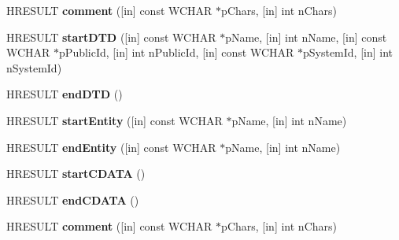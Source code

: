 \begin{DoxyCompactItemize}
H\+R\+E\+S\+U\+LT {\bfseries comment} (\mbox{[}in\mbox{]} const W\+C\+H\+AR $\ast$p\+Chars, \mbox{[}in\mbox{]} int n\+Chars)
\item 
\mbox{\label{interface_m_s_x_m_l2_1_1_i_s_a_x_lexical_handler_a9dc751b2bda45f399fbf6840e72a1248}} 
H\+R\+E\+S\+U\+LT {\bfseries start\+D\+TD} (\mbox{[}in\mbox{]} const W\+C\+H\+AR $\ast$p\+Name, \mbox{[}in\mbox{]} int n\+Name, \mbox{[}in\mbox{]} const W\+C\+H\+AR $\ast$p\+Public\+Id, \mbox{[}in\mbox{]} int n\+Public\+Id, \mbox{[}in\mbox{]} const W\+C\+H\+AR $\ast$p\+System\+Id, \mbox{[}in\mbox{]} int n\+System\+Id)
\item 
\mbox{\label{interface_m_s_x_m_l2_1_1_i_s_a_x_lexical_handler_ae998805090d10f27b3e349a410d7583e}} 
H\+R\+E\+S\+U\+LT {\bfseries end\+D\+TD} ()
\item 
\mbox{\label{interface_m_s_x_m_l2_1_1_i_s_a_x_lexical_handler_abd6b0f77da7917b1f52b494e028bad61}} 
H\+R\+E\+S\+U\+LT {\bfseries start\+Entity} (\mbox{[}in\mbox{]} const W\+C\+H\+AR $\ast$p\+Name, \mbox{[}in\mbox{]} int n\+Name)
\item 
\mbox{\label{interface_m_s_x_m_l2_1_1_i_s_a_x_lexical_handler_a8ea421b901347b2bf441d230f1a62740}} 
H\+R\+E\+S\+U\+LT {\bfseries end\+Entity} (\mbox{[}in\mbox{]} const W\+C\+H\+AR $\ast$p\+Name, \mbox{[}in\mbox{]} int n\+Name)
\item 
\mbox{\label{interface_m_s_x_m_l2_1_1_i_s_a_x_lexical_handler_aad16b9ac4f18c8fe10cdab176202fd45}} 
H\+R\+E\+S\+U\+LT {\bfseries start\+C\+D\+A\+TA} ()
\item 
\mbox{\label{interface_m_s_x_m_l2_1_1_i_s_a_x_lexical_handler_a4bfd40c57cec0cdc15e19724934bfccd}} 
H\+R\+E\+S\+U\+LT {\bfseries end\+C\+D\+A\+TA} ()
\item 
\mbox{\label{interface_m_s_x_m_l2_1_1_i_s_a_x_lexical_handler_a872a71206758098ed46b26aba0550c05}} 
H\+R\+E\+S\+U\+LT {\bfseries comment} (\mbox{[}in\mbox{]} const W\+C\+H\+AR $\ast$p\+Chars, \mbox{[}in\mbox{]} int n\+Chars)

\end{DoxyCompactItemize}
